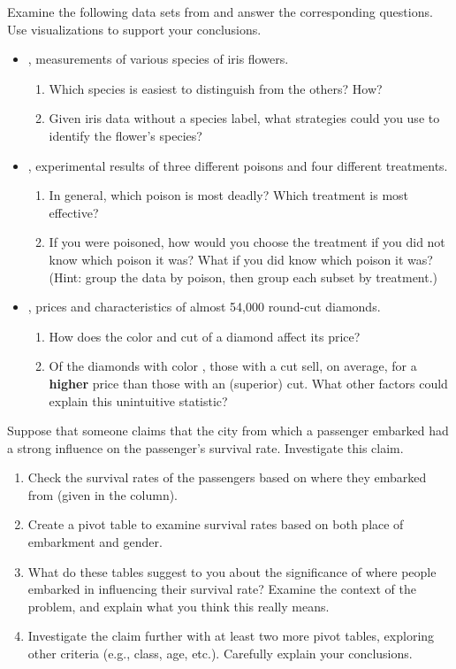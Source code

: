 Examine the following data sets from  and answer the corresponding questions.
Use visualizations to support your conclusions.

\begin{itemize}
    \item {}, measurements of various species of iris flowers.
    \begin{enumerate}
        \item Which species is easiest to distinguish from the others? How?
        \item Given iris data without a species label, what strategies could you use to identify the flower's species?
    \end{enumerate}
    \item {}, experimental results of three different poisons and four different treatments.
    \begin{enumerate}
        \item In general, which poison is most deadly?
        Which treatment is most effective?
        \item If you were poisoned, how would you choose the treatment if you did not know which poison it was? What if you did know which poison it was?
        \\(Hint: group the data by poison, then group each subset by treatment.)
    \end{enumerate}
    \item {}, prices and characteristics of almost 54,000 round-cut diamonds.
    \begin{enumerate}
        \item How does the color and cut of a diamond affect its price?
        \item Of the diamonds with color , those with a  cut sell, on average, for a \textbf{higher} price than those with an  (superior) cut.
        What other factors could explain this unintuitive statistic?
    \end{enumerate}
\end{itemize}
Suppose that someone claims that the city from which a passenger embarked had a strong influence on the passenger's survival rate.
Investigate this claim.
\begin{enumerate}
    \item Check the survival rates of the passengers based on where they embarked from (given in the  column).
    \item Create a pivot table to examine survival rates based on both place of embarkment and gender.
    \item What do these tables suggest to you about the significance of where people embarked in influencing their survival rate?
    Examine the context of the problem, and explain what you think this really means.
    \item Investigate the claim further with at least two more pivot tables, exploring other criteria (e.g., class, age, etc.).
    Carefully explain your conclusions.
\end{enumerate}
